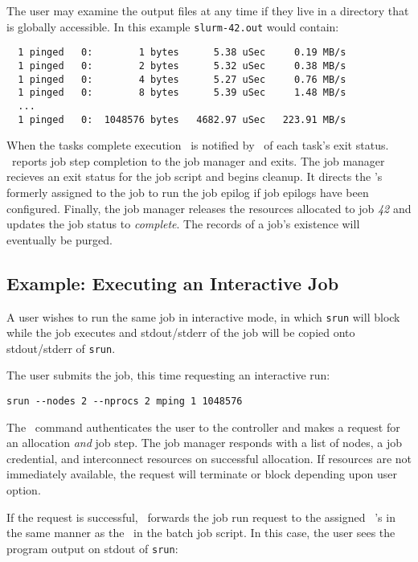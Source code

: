 The user may examine the output files at any time if they live
in a directory that is globally accessible. In this example
{\tt slurm-42.out} would  contain:

\begin{verbatim}
  1 pinged   0:        1 bytes      5.38 uSec     0.19 MB/s                     
  1 pinged   0:        2 bytes      5.32 uSec     0.38 MB/s                     
  1 pinged   0:        4 bytes      5.27 uSec     0.76 MB/s                     
  1 pinged   0:        8 bytes      5.39 uSec     1.48 MB/s                     
  ...
  1 pinged   0:  1048576 bytes   4682.97 uSec   223.91 MB/s              
\end{verbatim}

When the tasks complete execution \srun\ is notified by \slurmd\ of each
task's exit status. \srun\ reports job step completion to the job manager
and exits. The job manager recieves an exit status for the job script
and begins cleanup. It directs the \slurmd 's formerly assigned to the
job to run the job epilog if job epilogs have been configured. Finally,
the job manager releases the resources allocated to job {\em 42}
and updates the job status to {\em complete}. The records of a job's
existence will eventually be purged.

\subsection{Example:  Executing an Interactive Job}

A user wishes to run the same job in interactive mode, in which {\tt srun}
will block while the job executes and stdout/stderr of the job will be 
copied onto stdout/stderr of {\tt srun}.

The user submits the job, this time requesting an interactive run:
\begin{verbatim}
srun --nodes 2 --nprocs 2 mping 1 1048576
\end{verbatim}

The \srun\ command authenticates the user to the controller and
makes a request for an allocation {\em and} job step. The job manager
responds with a list of nodes, a job credential, and interconnect
resources on successful allocation. If resources are not immediately
available, the request will terminate or block depending upon user
option.

If the request is successful, \srun\ forwards the job run request
to the assigned \slurmd~'s in the same manner as the \srun\ in the
batch job script. In this case, the user sees the program output on 
stdout of {\tt srun}:

